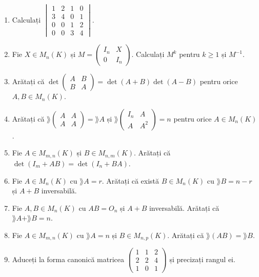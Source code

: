 \begin{enumerate}[label=\textbf{\arabic*.},leftmargin=*]
\item Calculați $\begin{vmatrix}1&2&1&0\\3&4&0&1\\0&0&1&2\\0&0&3&4\end{vmatrix}$.
\item Fie $X\in M_n(K)$ și $M=\begin{pmatrix}I_n&X\\0&I_n\end{pmatrix}$. Calculați $M^k$ pentru $k\ge1$ și $M^{-1}$.
\item Arătați că $\det\begin{pmatrix}A&B\\B&A\end{pmatrix}=\det(A+B)\det(A-B)$ pentru orice $A,B\in M_n(K)$.
\item Arătați că $\rang\begin{pmatrix}A&A\\A&A\end{pmatrix}=\rang A$ și $\rang\begin{pmatrix}I_n&A\\A&A^2\end{pmatrix}=n$ pentru orice $A\in M_n(K)$.
\item Fie $A\in M_{m,n}(K)$ și $B\in M_{n,m}(K)$. Arătați că $\det(I_m+AB)=\det(I_n+BA)$.
\item Fie $A\in M_n(K)$ cu $\rang A=r$. Arătați că există $B\in M_n(K)$ cu $\rang B=n-r$ și $A+B$ inversabilă.
\item Fie $A,B\in M_n(K)$ cu $AB=O_n$ și $A+B$ inversabilă. Arătați că $\rang A+\rang B=n$.
\item Fie $A\in M_{m,n}(K)$ cu $\rang A=n$ și $B\in M_{n,p}(K)$. Arătați că $\rang(AB)=\rang B$.
\item Aduceți la forma canonică matricea $\begin{pmatrix}1&1&2\\2&2&4\\1&0&1\end{pmatrix}$ și precizați rangul ei.
\end{enumerate}

